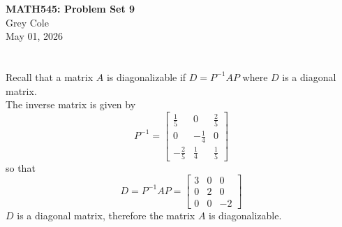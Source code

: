 \documentclass[]{article}
\newcommand{\bmat}[1]{\begin{bmatrix}#1\end{bmatrix}}
\begin{document}
	\begin{center}
		{\Large\textbf{MATH545: Problem Set 9}}\\
		\large Grey Cole\\
		May 01, 2026
	\end{center}
	
	\section{}
	Recall that a matrix $A$ is diagonalizable if $D = P^{-1}AP$ where $D$ is a diagonal matrix.\\
	The inverse matrix is given by 
	\[ P^{-1} = \bmat{\frac{1}{5} & 0 & \frac{2}{5}\\0&-\frac{1}{4}&0\\-\frac{2}{5}&\frac{1}{4}&\frac{1}{5}} \]
	so that
	\[ D = P^{-1}AP = \bmat{ 3&0&0\\0&2&0\\0&0&-2 } \]
	$D$ is a diagonal matrix, therefore the matrix $A$ is diagonalizable.
\end{document}
